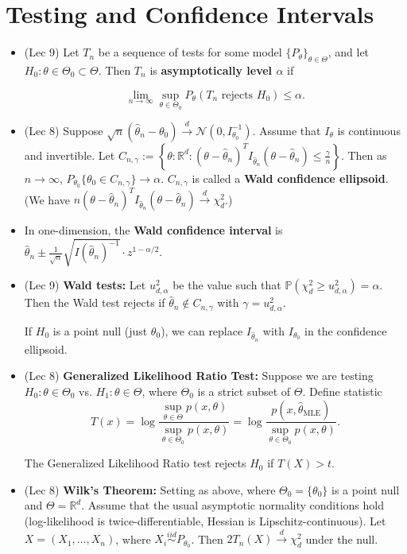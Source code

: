 \documentclass[twoside]{article}
\newcommand{\dis}{\displaystyle}
\newcommand\bbP{\mathbb{P}}
\newcommand\bbR{\mathbb{R}}
\newcommand\calN{\mathcal{N}}
\def\t{\theta}
\newcommand\T{\Theta}
\newcommand\cd{\stackrel{d}{\goesto}}
\newcommand\goesto{\rightarrow}
\begin{document}
\section{Testing and Confidence Intervals}
\begin{itemize}
\item (Lec 9) Let $T_n$ be a sequence of tests for some model $\{P_\theta\}_{\theta \in \Theta}$, and let $H_0: \theta \in \Theta_0 \subset \Theta$. Then $T_n$ is \textbf{asymptotically level $\alpha$} if 

\[\lim_{n\rightarrow\infty} \sup_{\theta \in \Theta_0} P_\theta(T_n \text{ rejects } H_0) \leq \alpha. \]

\item (Lec 8) Suppose $\sqrt{n}(\hat{\t}_n - \t_0) \cd \calN(0, I_{\t_0}^{-1})$. Assume that $I_\t$ is continuous and invertible. Let $C_{n, \gamma} := \left\{ \t: \bbR^d: (\t - \hat{\t}_n)^T I_{\hat{\t}_n} (\t - \hat{\t}_n) \leq \dis\frac{\gamma}{n} \right\}$. Then as $n \goesto \infty$, $P_{\t_0} \{ \t_0 \in C_{n, \gamma} \} \goesto \alpha$. $C_{n, \gamma}$ is called a \textbf{Wald confidence ellipsoid}. (We have $n(\t - \hat{\t}_n)^T I_{\hat{\t}_n} (\t - \hat{\t}_n) \cd \chi_d^2$.)

\item In one-dimension, the \textbf{Wald confidence interval} is $\hat{\t}_n \pm \dis\frac{1}{\sqrt{n}}\sqrt{I(\hat{\t}_n)^{-1}} \cdot z^{1 - \alpha/2}$.

\item (Lec 9) \textbf{Wald tests:} Let $u_{d, \alpha}^2$ be the value such that $\bbP(\chi_d^2 \geq u_{d, \alpha}^2) = \alpha$. Then the Wald test rejects if $\hat{\t}_n \notin C_{n,\gamma}$ with $\gamma = u_{d, \alpha}^2$.

If $H_0$ is a point null (just $\t_0$), we can replace $I_{\hat{\t}_n}$ with $I_{\t_0}$ in the confidence ellipsoid.

\item (Lec 8) \textbf{Generalized Likelihood Ratio Test:} Suppose we are testing $H_0: \t \in \T_0$ vs. $H_1: \t \in \T$, where $\T_0$ is a strict subset of $\T$. Define statistic
\[ T(x)=\log \frac{\sup_{\theta\in\Theta}p(x,\theta)}{\sup_{\theta\in\Theta_0}p(x,\theta)}=\log \frac{p(x,\hat{\theta}_{\text{MLE}})}{\sup_{\theta\in\Theta_0}p(x,\theta)}. \]

The Generalized Likelihood Ratio test rejects $H_0$ if $T(X) > t$.

\item (Lec 8) \textbf{Wilk's Theorem:} Setting as above, where $\T_0 = \{ \t_0 \}$ is a point null and $\T = \bbR^d$. Assume that the usual asymptotic normality conditions hold (log-likelihood is twice-differentiable, Hessian is Lipschitz-continuous). Let $X = (X_1, \dots, X_n)$, where $X_i \stackrel{iid}{\sim} P_{\t_0}$. Then $2 T_n (X) \cd \chi_d^2$ under the null.


\end{itemize}
\end{document}
